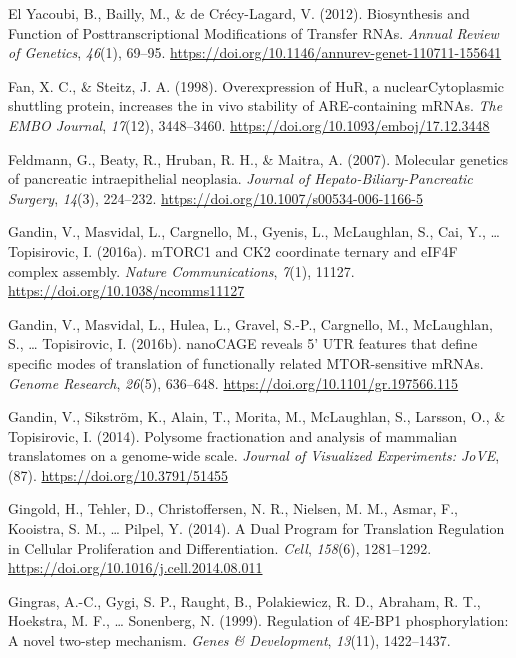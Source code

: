 \documentclass[12pt,openany]{book}
\begin{document}
\hypertarget{ref-ElYacoubi2012}{}
El Yacoubi, B., Bailly, M., \& de Crécy-Lagard, V. (2012). Biosynthesis
and Function of Posttranscriptional Modifications of Transfer RNAs.
\emph{Annual Review of Genetics}, \emph{46}(1), 69--95.
\url{https://doi.org/10.1146/annurev-genet-110711-155641}

\hypertarget{ref-Fan1998}{}
Fan, X. C., \& Steitz, J. A. (1998). Overexpression of HuR, a
nuclearCytoplasmic shuttling protein, increases the in vivo stability of
ARE-containing mRNAs. \emph{The EMBO Journal}, \emph{17}(12),
3448--3460. \url{https://doi.org/10.1093/emboj/17.12.3448}

\hypertarget{ref-Feldmann2007}{}
Feldmann, G., Beaty, R., Hruban, R. H., \& Maitra, A. (2007). Molecular
genetics of pancreatic intraepithelial neoplasia. \emph{Journal of
Hepato-Biliary-Pancreatic Surgery}, \emph{14}(3), 224--232.
\url{https://doi.org/10.1007/s00534-006-1166-5}

\hypertarget{ref-Gandin2016}{}
Gandin, V., Masvidal, L., Cargnello, M., Gyenis, L., McLaughlan, S.,
Cai, Y., \ldots{} Topisirovic, I. (2016a). mTORC1 and CK2 coordinate
ternary and eIF4F complex assembly. \emph{Nature Communications},
\emph{7}(1), 11127. \url{https://doi.org/10.1038/ncomms11127}

\hypertarget{ref-Gandin2016a}{}
Gandin, V., Masvidal, L., Hulea, L., Gravel, S.-P., Cargnello, M.,
McLaughlan, S., \ldots{} Topisirovic, I. (2016b). nanoCAGE reveals 5'
UTR features that define specific modes of translation of functionally
related MTOR-sensitive mRNAs. \emph{Genome Research}, \emph{26}(5),
636--648. \url{https://doi.org/10.1101/gr.197566.115}

\hypertarget{ref-Gandin2014}{}
Gandin, V., Sikström, K., Alain, T., Morita, M., McLaughlan, S.,
Larsson, O., \& Topisirovic, I. (2014). Polysome fractionation and
analysis of mammalian translatomes on a genome-wide scale. \emph{Journal
of Visualized Experiments: JoVE}, (87).
\url{https://doi.org/10.3791/51455}

\hypertarget{ref-Gingold2014}{}
Gingold, H., Tehler, D., Christoffersen, N. R., Nielsen, M. M., Asmar,
F., Kooistra, S. M., \ldots{} Pilpel, Y. (2014). A Dual Program for
Translation Regulation in Cellular Proliferation and Differentiation.
\emph{Cell}, \emph{158}(6), 1281--1292.
\url{https://doi.org/10.1016/j.cell.2014.08.011}

\hypertarget{ref-Gingras1999}{}
Gingras, A.-C., Gygi, S. P., Raught, B., Polakiewicz, R. D., Abraham, R.
T., Hoekstra, M. F., \ldots{} Sonenberg, N. (1999). Regulation of 4E-BP1
phosphorylation: A novel two-step mechanism. \emph{Genes \&
Development}, \emph{13}(11), 1422--1437.
\end{document}
